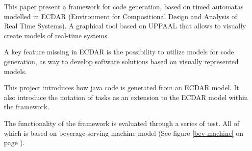 This paper present a framework for code generation, based on timed automatas modelled in ECDAR (Environment for Compositional Design and Analysis of Real Time Systems). A graphical tool based on UPPAAL that allows to visually create models of real-time systems.

A key feature missing in ECDAR is the possibility to utilize models for code generation, as way to develop software solutions based on visually represented models.

This project introduces how java code is generated from an ECDAR model. It also introduce the notation of tasks as an extension to the ECDAR model within the framework.

The functionality of the framework is evaluated through a series of test. All of which is based on beverage-serving machine model (See figure \ref{bev-machine} on page \pageref{bev-machine}).


